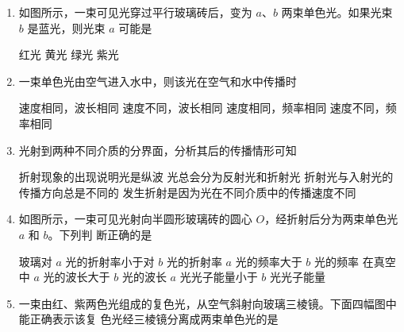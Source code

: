 

\begin{enumerate}
	\item
{}
 如图所示，一束可见光穿过平行玻璃砖后，变为
$ a $、$ b $ 两束单色光。如果光束 $ b $ 是蓝光，则光束 $ a $ 可能是  
\begin{figure}[h!]
	\centering
	
\end{figure}

\fourchoices
{红光}
{黄光}
{绿光}
{紫光}




\item 
{}
一束单色光由空气进入水中，则该光在空气和水中传播时  

\fourchoices
{速度相同，波长相同}
{速度不同，波长相同}
{速度相同，频率相同}
{速度不同，频率相同}




\item 
{}
光射到两种不同介质的分界面，分析其后的传播情形可知  

\fourchoices
{折射现象的出现说明光是纵波}
{光总会分为反射光和折射光}
{折射光与入射光的传播方向总是不同的}
{发生折射是因为光在不同介质中的传播速度不同}


\item 
{}
如图所示，一束可见光射向半圆形玻璃砖的圆心 $ O $，经折射后分为两束单色光 $ a $ 和 $ b $。下列判
断正确的是  
\begin{figure}[h!]
	\centering
	
\end{figure}

\fourchoices
{玻璃对 $ a $ 光的折射率小于对 $ b $ 光的折射率}
{$ a $ 光的频率大于 $ b $ 光的频率}
{在真空中 $ a $ 光的波长大于 $ b $ 光的波长}
{$ a $ 光光子能量小于 $ b $ 光光子能量}


\item 
{}
一束由红、紫两色光组成的复色光，从空气斜射向玻璃三棱镜。下面四幅图中能正确表示该复
色光经三棱镜分离成两束单色光的是  

\pfourchoices
{}
{}
{}
{}



\end{enumerate}
